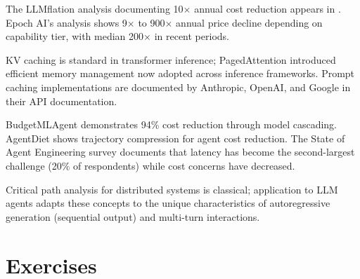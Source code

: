 The LLMflation analysis documenting 10$\times$ annual cost reduction appears in \cite{llmflation2024}. Epoch AI's analysis \cite{epochpricing2025} shows 9$\times$ to 900$\times$ annual price decline depending on capability tier, with median 200$\times$ in recent periods.

KV caching is standard in transformer inference; PagedAttention \cite{vllm2023} introduced efficient memory management now adopted across inference frameworks. Prompt caching implementations are documented by Anthropic, OpenAI, and Google in their API documentation.

BudgetMLAgent \cite{budgetmlagent2024} demonstrates 94\% cost reduction through model cascading. AgentDiet \cite{agentdiet2024} shows trajectory compression for agent cost reduction. The State of Agent Engineering survey \cite{stateofagent2025} documents that latency has become the second-largest challenge (20\% of respondents) while cost concerns have decreased.

Critical path analysis for distributed systems is classical; application to LLM agents adapts these concepts to the unique characteristics of autoregressive generation (sequential output) and multi-turn interactions.

\section*{Exercises}

